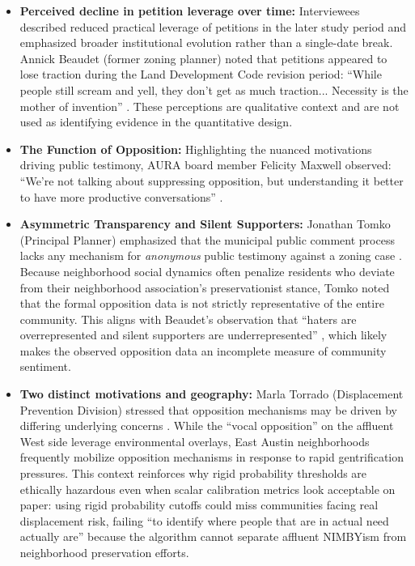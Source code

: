 \documentclass[11pt, letterpaper]{article}
\begin{document}
\begin{itemize}
    \item \textbf{Perceived decline in petition leverage over time:} Interviewees described reduced practical leverage of petitions in the later study period and emphasized broader institutional evolution rather than a single-date break. Annick Beaudet (former zoning planner) noted that petitions appeared to lose traction during the Land Development Code revision period: ``While people still scream and yell, they don't get as much traction... Necessity is the mother of invention'' \cite{interview_beaudet2025,cityaustin2017codenext}. These perceptions are qualitative context and are not used as identifying evidence in the quantitative design.

    \item \textbf{The Function of Opposition:} Highlighting the nuanced motivations driving public testimony, AURA board member Felicity Maxwell observed: ``We're not talking about suppressing opposition, but understanding it better to have more productive conversations'' \cite{interview_maxwell2026}.
    \item \textbf{Asymmetric Transparency and Silent Supporters:} Jonathan Tomko (Principal Planner) emphasized that the municipal public comment process lacks any mechanism for \textit{anonymous} public testimony against a zoning case \cite{interview_tomko2026}. Because neighborhood social dynamics often penalize residents who deviate from their neighborhood association's preservationist stance, Tomko noted that the formal opposition data is not strictly representative of the entire community. This aligns with Beaudet's observation that ``haters are overrepresented and silent supporters are underrepresented'' \cite{interview_beaudet2025}, which likely makes the observed opposition data an incomplete measure of community sentiment.
    \item \textbf{Two distinct motivations and geography:} Marla Torrado (Displacement Prevention Division) stressed that opposition mechanisms may be driven by differing underlying concerns \cite{interview_marla2025}. While the ``vocal opposition'' on the affluent West side leverage environmental overlays, East Austin neighborhoods frequently mobilize opposition mechanisms in response to rapid gentrification pressures. This context reinforces why rigid probability thresholds are ethically hazardous even when scalar calibration metrics look acceptable on paper: using rigid probability cutoffs could miss communities facing real displacement risk, failing ``to identify where people that are in actual need actually are'' because the algorithm cannot separate affluent NIMBYism from neighborhood preservation efforts.
\end{itemize}
\end{document}
